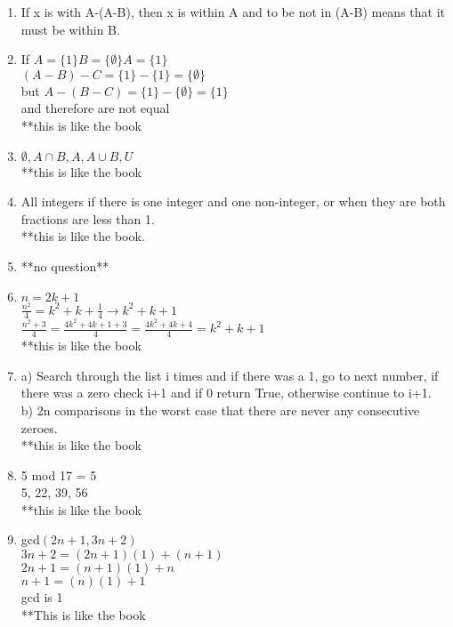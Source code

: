 \documentclass{article}
\begin{document}
\begin{enumerate}
  \item If x is with A-(A-B), then x is within A and to be not in (A-B) means that it must be within B.

  \item If $A = \{1\} B = \{ \emptyset \} A = \{1\}$ \\
	$(A-B)-C = \{1\} - \{1\} = \{ \emptyset \}$ \\
	but $A-(B-C) = \{1\} - \{ \emptyset \} = \{1\} $ \\
	and therefore are not equal \\
	**this is like the book

  \item $ \emptyset , A \cap B, A, A \cup B, U$ \\
	**this is like the book

  \item All integers if there is one integer and one non-integer, or when they are both fractions are less than 1. \\
	**this is like the book.

  \item **no question**

  \item $n = 2k +1$ \\
	$\frac {n^2}{4} = k^2 + k + \frac {1}{4} \rightarrow k^2+k+1$ \\
	$\frac {n^2+3}{4} = \frac {4k^2+4k+1+3}{4} = \frac {4k^2+4k+4}{4} = k^2+k+1$ \\
	**this is like the book

  \item
	a) Search through the list i times and if there was a 1, go to next number, if there was a zero check i+1 and if 0 return True, otherwise continue to i+1. \\
        b) 2n comparisons in the worst case that there are never any consecutive zeroes. \\
	**this is like the book

  \item 5 mod 17 = 5 \\
	5, 22, 39, 56 \\
	**this is like the book

  \item gcd$(2n+1, 3n+2) $ \\
	$3n +2 = (2n +1)(1) + (n+1) $\\
	$2n +1 = (n+1)(1) + n$ \\
	$n +1 = (n)(1) + 1$ \\
	gcd is 1\\
	**This is like the book


\end{enumerate}
\end{document}
